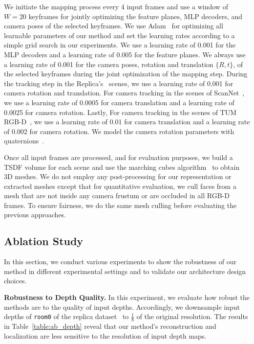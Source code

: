 We initiate the mapping process every 4 input frames and use a window of $W=20$ keyframes for jointly optimizing the feature planes, MLP decoders, and camera poses of the selected keyframes. We use Adam~\cite{adam} for optimizing all learnable parameters of our method and set the learning rates according to a simple grid search in our experiments. We use a learning rate of 0.001 for the MLP decoders and a learning rate of 0.005 for the feature planes. We always use a learning rate of 0.001 for the camera poses, \ie rotation and translation $\{R,t\}$, of the selected keyframes during the joint optimization of the mapping step. During the tracking step in the Replica's~\cite{replica19arxiv} scenes, we use a learning rate of 0.001 for camera rotation and translation. For camera tracking in the scenes of ScanNet~\cite{dai2017scannet}, we use a learning rate of 0.0005 for camera translation and a learning rate of 0.0025 for camera rotation. Lastly, For camera tracking in the scenes of TUM RGB-D~\cite{sturm2012benchmark}, we use a learning rate of 0.01 for camera translation and a learning rate of 0.002 for camera rotation. We model the camera rotation parameters with quaternions~\cite{shoemake1985animating}.

Once all input frames are processed, and for evaluation purposes, we build a TSDF volume for each scene and use the marching cubes algorithm~\cite{lorensen1987marching} to obtain 3D meshes. We do not employ any post-processing for our representation or extracted meshes except that for quantitative evaluation, we cull faces from a mesh that are not inside any camera frustum or are occluded in all RGB-D frames. To ensure fairness, we do the same mesh culling before evaluating the previous approaches.

\subsection{Ablation Study} \label{sec:c4_ablation}

In this section, we conduct various experiments to show the robustness of our method in different experimental settings and to validate our architecture design choices.

\vspace{1ex}
\noindent\textbf{Robustness to Depth Quality.} In this experiment, we evaluate how robust the methods are to the quality of input depths. Accordingly, we downsample input depths of \texttt{room0} of the replica dataset~\cite{replica19arxiv} to $\frac{1}{8}$ of the original resolution. The results in Table~\ref{table:ab_depth} reveal that our method's reconstruction and localization are less sensitive to the resolution of input depth maps.

